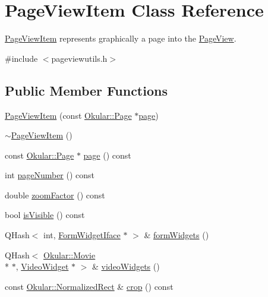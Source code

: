 \hypertarget{classPageViewItem}{\section{Page\+View\+Item Class Reference}
\label{classPageViewItem}
}


\hyperlink{classPageViewItem}{Page\+View\+Item} represents graphically a page into the \hyperlink{classPageView}{Page\+View}.  




{\ttfamily \#include $<$pageviewutils.\+h$>$}

\subsection*{Public Member Functions}
\begin{DoxyCompactItemize}
\item 
\hyperlink{classPageViewItem_a309d8671e7dc72dcb3e08e7c64886f05}{Page\+View\+Item} (const \hyperlink{classOkular_1_1Page}{Okular\+::\+Page} $\ast$\hyperlink{classPageViewItem_a5c512d95e5563e8d19d1fb3d93dafc31}{page})
\item 
\hyperlink{classPageViewItem_a9636b20b548065c6cd904a16ba4625d3}{$\sim$\+Page\+View\+Item} ()
\item 
const \hyperlink{classOkular_1_1Page}{Okular\+::\+Page} $\ast$ \hyperlink{classPageViewItem_a5c512d95e5563e8d19d1fb3d93dafc31}{page} () const 
\item 
int \hyperlink{classPageViewItem_ad75aab4c1ffd842bd5d54c0cfe84d1bf}{page\+Number} () const 
\item 
double \hyperlink{classPageViewItem_a49bd277d8c33f520df31548ef22373ea}{zoom\+Factor} () const 
\item 
bool \hyperlink{classPageViewItem_ae7a4dfa618d0cb56e01075842c67bf9f}{is\+Visible} () const 
\item 
Q\+Hash$<$ int, \hyperlink{classFormWidgetIface}{Form\+Widget\+Iface} $\ast$ $>$ \& \hyperlink{classPageViewItem_a24394acf608eed67ef99280f6958258d}{form\+Widgets} ()
\item 
Q\+Hash$<$ \hyperlink{classOkular_1_1Movie}{Okular\+::\+Movie} \\*
$\ast$, \hyperlink{classVideoWidget}{Video\+Widget} $\ast$ $>$ \& \hyperlink{classPageViewItem_a125302408597cab2a58ef2ad309e2912}{video\+Widgets} ()
\item 
const \hyperlink{classOkular_1_1NormalizedRect}{Okular\+::\+Normalized\+Rect} \& \hyperlink{classPageViewItem_a587a87792c6c65854b512192274f9c78}{crop} () const 

\end{DoxyCompactItemize}

